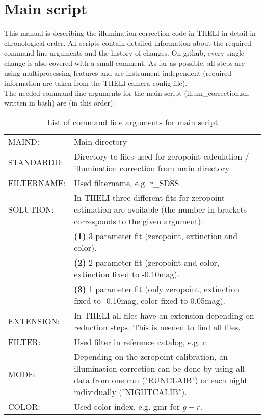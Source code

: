 \chapter{Main script}
\label{ch:MainScript}
This manual is describing the illumination correction code in THELI in detail in chronological order. All scripts contain detailed information about the required command line arguments and the history of changes. On github, every single change is also covered with a small comment. As far as possible, all steps are using multiprocessing features and are instrument independent (required information are taken from the THELI camera config file).\\
The needed command line arguments for the main script (illum\_correction.sh, written in bash) are (in this order):

\begin{table}[H]
\centering
\begin{tabular}{lp{11.5cm}}
MAIND: & Main directory\\
STANDARDD: & Directory to files used for zeropoint calculation / illumination correction from main directory\\
FILTERNAME: & Used filtername, e.g. r\_SDSS\\
SOLUTION: & In \textrm{THELI} three different fits for zeropoint estimation are available (the number in brackets corresponds to the given argument):\\
 & \textbf{(1)} 3 parameter fit (zeropoint, extinction and color).\\
 & \textbf{(2)} 2 parameter fit (zeropoint and color, extinction fixed to -0.10mag).\\
 & \textbf{(3)} 1 parameter fit (only zeropoint, extinction fixed to -0.10mag, color fixed to 0.05mag).\\
EXTENSION: & In \textrm{THELI} all files have an extension depending on reduction steps. This is needed to find all files.\\
FILTER: & Used filter in reference catalog, e.g. r.\\
MODE: & Depending on the zeropoint calibration, an illumination correction can be done by using all data from one run ("RUNCLAIB") or each night individually ("NIGHTCALIB").\\
COLOR: & Used color index, e.g. gmr for $g-r$.
\end{tabular}
\caption{List of command line arguments for main script}
\label{tab:CommandLineArgumentsMainScript}
\end{table}

